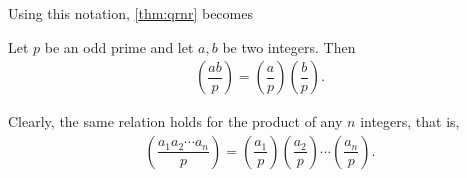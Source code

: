 \documentclass[main.tex]{subfile}
\begin{document}
	Using this notation, \autoref{thm:qrnr} becomes
	\begin{theorem}\label{thm:qrproduct}
		Let $p$ be an odd prime and let $a,b$ be two integers. Then
		\begin{align*}
			\left(\dfrac{ab}{p}\right) = \left(\dfrac{a}{p}\right) \left(\dfrac{b}{p}\right).
		\end{align*}
	\end{theorem}

	\begin{remark}
		Clearly, the same relation holds for the product of any $n$ integers, that is,
		\begin{align*}
			\left(\dfrac{a_1a_2\cdots a_n}{p}\right) = \left(\dfrac{a_1}{p}\right) \left(\dfrac{a_2}{p}\right) \cdots \left(\dfrac{a_n}{p}\right).
		\end{align*}
	\end{remark}
\end{document}
